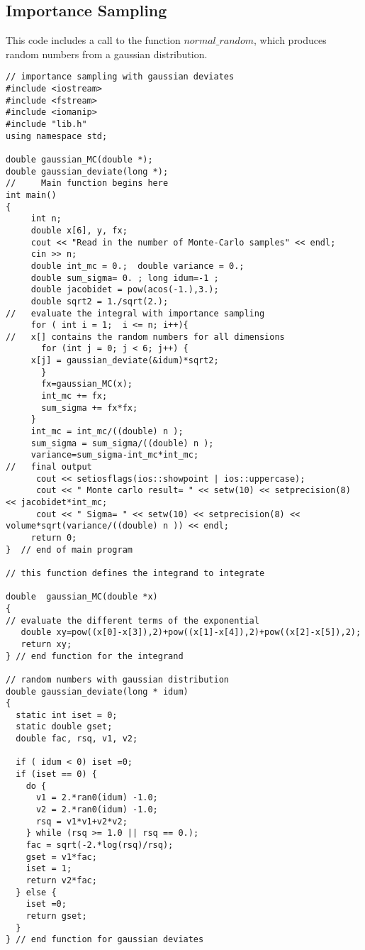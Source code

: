 \subsection{Importance Sampling}
This code includes a call to the function $normal\_random$, which produces
random numbers from a gaussian distribution. 
\begin{lstlisting}[title={\url{http://folk.uio.no/mhjensen/compphys/programs/chapter11/cpp/program5.cpp}}]
// importance sampling with gaussian deviates
#include <iostream>
#include <fstream>
#include <iomanip>
#include "lib.h"
using namespace std;

double gaussian_MC(double *);
double gaussian_deviate(long *);
//     Main function begins here     
int main()
{
     int n;
     double x[6], y, fx; 
     cout << "Read in the number of Monte-Carlo samples" << endl;
     cin >> n;
     double int_mc = 0.;  double variance = 0.;
     double sum_sigma= 0. ; long idum=-1 ;  
     double jacobidet = pow(acos(-1.),3.);
     double sqrt2 = 1./sqrt(2.);
//   evaluate the integral with importance sampling    
     for ( int i = 1;  i <= n; i++){
//   x[] contains the random numbers for all dimensions
       for (int j = 0; j < 6; j++) {
	 x[j] = gaussian_deviate(&idum)*sqrt2;
       }
       fx=gaussian_MC(x); 
       int_mc += fx;
       sum_sigma += fx*fx;
     }
     int_mc = int_mc/((double) n );
     sum_sigma = sum_sigma/((double) n );
     variance=sum_sigma-int_mc*int_mc;
//   final output 
      cout << setiosflags(ios::showpoint | ios::uppercase);
      cout << " Monte carlo result= " << setw(10) << setprecision(8) << jacobidet*int_mc;
      cout << " Sigma= " << setw(10) << setprecision(8) << volume*sqrt(variance/((double) n )) << endl;
     return 0;
}  // end of main program 

// this function defines the integrand to integrate 
 
double  gaussian_MC(double *x) 
{
// evaluate the different terms of the exponential
   double xy=pow((x[0]-x[3]),2)+pow((x[1]-x[4]),2)+pow((x[2]-x[5]),2);
   return xy;
} // end function for the integrand

// random numbers with gaussian distribution
double gaussian_deviate(long * idum)
{
  static int iset = 0;
  static double gset;
  double fac, rsq, v1, v2;

  if ( idum < 0) iset =0;
  if (iset == 0) {
    do {
      v1 = 2.*ran0(idum) -1.0;
      v2 = 2.*ran0(idum) -1.0;
      rsq = v1*v1+v2*v2;
    } while (rsq >= 1.0 || rsq == 0.);
    fac = sqrt(-2.*log(rsq)/rsq);
    gset = v1*fac;
    iset = 1;
    return v2*fac;
  } else {
    iset =0;
    return gset;
  }
} // end function for gaussian deviates
\end{lstlisting}
